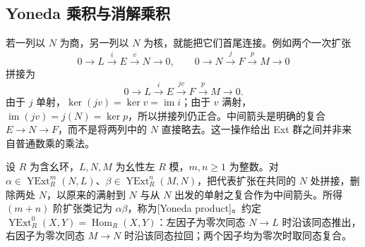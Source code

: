 \subsection{Yoneda 乘积与消解乘积}
\label{b4:subsec:0901:03}

若一列以 \(N\) 为商，另一列以 \(N\) 为核，就能把它们首尾连接。例如两个一次扩张
\[
	0\longrightarrow L\xrightarrow{i}E\xrightarrow{v}N\longrightarrow0, \qquad 0\longrightarrow N\xrightarrow{j}F\xrightarrow{p}M\longrightarrow0
\]
拼接为
\[
	0\longrightarrow L\xrightarrow{i}E\xrightarrow{jv}F \xrightarrow{p}M\longrightarrow0.
\]
由于 \(j\) 单射，\(\ker(jv)=\ker v=\operatorname{im}i\)；由于 \(v\) 满射，\(\operatorname{im}(jv)=j(N)=\ker p\)，所以拼接列仍正合。中间箭头是明确的复合 \(E\to N\to F\)，而不是将两列中的 \(N\) 直接略去。这一操作给出 Ext 群之间并非来自普通数乘的乘法。

\begin{definition}\label{b4:def:yoneda-product}
	设 \(R\) 为含幺环，\(L,N,M\) 为幺性左 \(R\) 模，\(m,n\ge1\) 为整数。对 \(\alpha\in\operatorname{YExt}_R^m(N,L)\)、\(\beta\in\operatorname{YExt}_R^n(M,N)\)，把代表扩张在共同的 \(N\) 处拼接，删除两处 \(N\)，以原来的满射到 \(N\) 与从 \(N\) 出发的单射之复合作为中间箭头。所得 \((m+n)\) 阶扩张类记为 \(\alpha\beta\)，称为[Yoneda product]。约定 \(\operatorname{YExt}_R^0(X,Y)=\operatorname{Hom}_R(X,Y)\)：左因子为零次同态 \(N\to L\) 时沿该同态推出，右因子为零次同态 \(M\to N\) 时沿该同态拉回；两个因子均为零次时取同态复合。
\end{definition}

